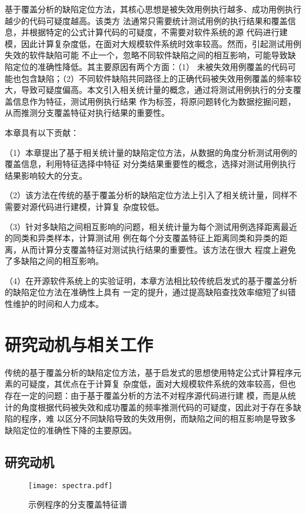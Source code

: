 基于覆盖分析的缺陷定位方法，其核心思想是被失效用例执行越多、成功用例执行越少的代码可疑度越高。该类方
法通常只需要统计测试用例的执行结果和覆盖信息，并根据特定的公式计算代码的可疑度，不需要对软件系统的源
代码进行建模，因此计算复杂度低，在面对大规模软件系统时效率较高。然而，引起测试用例失效的软件缺陷可能
不止一个，忽略不同软件缺陷之间的相互影响，可能导致缺陷定位的准确性降低。其主要原因有两个方面：（1）
未被失效用例覆盖的代码可能也包含缺陷；（2）不同软件缺陷共同路径上的正确代码被失效用例覆盖的频率较
大，导致可疑度偏高。本文引入相关统计量的概念，通过将测试用例执行的分支覆盖信息作为特征，测试用例执行结果
作为标签，将原问题转化为数据挖掘问题，从而推测分支覆盖特征对执行结果的重要性。

本章具有以下贡献：

（1）本章提出了基于相关统计量的缺陷定位方法，从数据的角度分析测试用例的覆盖信息，利用特征选择中特征
对分类结果重要性的概念，选择对测试用例执行结果影响较大的分支。

（2）该方法在传统的基于覆盖分析的缺陷定位方法上引入了相关统计量，同样不需要对源代码进行建模，计算复
杂度较低。

（3）针对多缺陷之间相互影响的问题，相关统计量为每个测试用例选择距离最近的同类和异类样本，计算测试用
例在每个分支覆盖特征上距离同类和异类的距离，从而计算分支覆盖特征对测试执行结果的重要性。该方法在很大
程度上避免了多缺陷之间的相互影响。

（4）在开源软件系统上的实验证明，本章方法相比较传统启发式的基于覆盖分析的缺陷定位方法在准确性上具有
一定的提升，通过提高缺陷查找效率缩短了纠错性维护的时间和人力成本。


\section{研究动机与相关工作}
传统的基于覆盖分析的缺陷定位方法，基于启发式的思想使用特定公式计算程序元素的可疑度，其优点在于计算复
杂度低，面对大规模软件系统的效率较高，但也存在一定的问题：由于基于覆盖分析的方法不对程序源代码进行建
模，而是从统计的角度根据代码被失效和成功覆盖的频率推测代码的可疑度，因此对于存在多缺陷的程序，难
以区分不同缺陷导致的失效用例，而缺陷之间的相互影响是导致多缺陷定位的准确性下降的主要原因。

\subsection{研究动机}
\begin{figure}[htp]
      \centering
      \texttt{[image: spectra.pdf]}
      \caption{示例程序的分支覆盖特征谱}
      \label{fig:spectra}
\end{figure}

